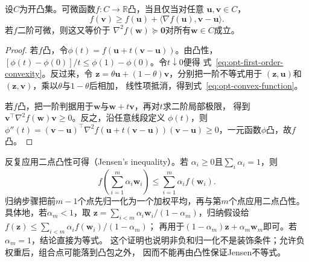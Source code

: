 \begin{theorem}[凸函数的一阶与二阶判据]
\label{thm:opt-convexity-criteria}
设$C$为开凸集。可微函数$f:C\to\mathbb{R}$凸，当且仅当对任意
$\bm{u},\bm{v}\in C$，
\begin{equation}
  f(\bm{v})\geq f(\bm{u})
  +\langle\nabla f(\bm{u}),\bm{v}-\bm{u}\rangle.
  \label{eq:opt-first-order-convexity}
\end{equation}
若$f$二阶可微，则这又等价于
$\nabla^2f(\bm{w})\succeq\bm{0}$对所有$\bm{w}\in C$成立。
\end{theorem}

\begin{proof}
若$f$凸，令$\phi(t)=f(\bm{u}+t(\bm{v}-\bm{u}))$。由凸性，
$[\phi(t)-\phi(0)]/t\leq\phi(1)-\phi(0)$。令$t\downarrow0$便得
式~\eqref{eq:opt-first-order-convexity}。反过来，令
$\bm{z}=\theta\bm{u}+(1-\theta)\bm{v}$，分别把一阶不等式用于
$(\bm{z},\bm{u})$和$(\bm{z},\bm{v})$，乘以$\theta$与$1-\theta$后相加，
线性项抵消，得到式~\eqref{eq:opt-convex-function}。

若$f$凸，把一阶判据用于$\bm{w}$与$\bm{w}+t\bm{v}$，再对$t$求二阶局部极限，
得到$\bm{v}^{\top}\nabla^2f(\bm{w})\bm{v}\geq0$。反之，沿任意线段定义
$\phi(t)$，则
$\phi''(t)=(\bm{v}-\bm{u})^{\top}\nabla^2f(\bm{u}+t(\bm{v}-\bm{u}))
(\bm{v}-\bm{u})\geq0$，一元函数$\phi$凸，故$f$凸。
\end{proof}

反复应用二点凸性可得（Jensen's inequality）。若
$\alpha_i\geq0$且$\sum_i\alpha_i=1$，则
\begin{equation}
  f\left(\sum_{i=1}^m\alpha_i\bm{w}_i\right)
  \leq\sum_{i=1}^m\alpha_i f(\bm{w}_i).
  \label{eq:opt-jensen}
\end{equation}
归纳步骤把前$m-1$个点先归一化为一个加权平均，再与第$m$个点应用二点凸性。
具体地，若$\alpha_m<1$，取
$\bm z=\sum_{i<m}\alpha_i\bm w_i/(1-\alpha_m)$，归纳假设给
$f(\bm z)\leq\sum_{i<m}\alpha_i f(\bm w_i)/(1-\alpha_m)$；
再用于$(1-\alpha_m)\bm z+\alpha_m\bm w_m$即可。若$\alpha_m=1$，结论直接为等式。
这个证明也说明非负和归一化不是装饰条件；允许负权重后，组合点可能落到凸包之外，
因而不能再由凸性保证Jensen不等式。

